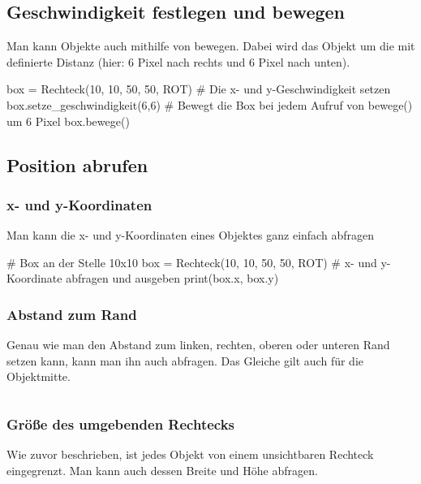\documentclass{\VorlagenPfad/coderdojokatext}
\begin{document}
\inputminted[firstline=29,lastline=38]{python}{../../../Beispiele/py2cd/objekte_positionieren.py}

\subsection{Geschwindigkeit festlegen und bewegen}
Man kann Objekte auch mithilfe von  bewegen. Dabei wird das Objekt um die mit  definierte Distanz (hier: 6 Pixel nach rechts und 6 Pixel nach unten).

\begin{pythoncode}
box = Rechteck(10, 10, 50, 50, ROT)
# Die x- und y-Geschwindigkeit setzen
box.setze_geschwindigkeit(6,6)
# Bewegt die Box bei jedem Aufruf von bewege() um 6 Pixel
box.bewege()
\end{pythoncode}



\subsection{Position abrufen}
\subsubsection{x- und y-Koordinaten}
Man kann die x- und y-Koordinaten eines Objektes ganz einfach abfragen
\begin{pythoncode}
# Box an der Stelle 10x10
box = Rechteck(10, 10, 50, 50, ROT)
# x- und y-Koordinate abfragen und ausgeben
print(box.x, box.y)
\end{pythoncode}

\subsubsection{Abstand zum Rand}
Genau wie man den Abstand zum linken, rechten, oberen  oder unteren Rand setzen kann, kann man ihn auch abfragen. Das Gleiche gilt auch für die Objektmitte.

\inputminted[firstline=42,lastline=60]{python}{../../../Beispiele/py2cd/objekte_positionieren.py}

\subsubsection{Größe des umgebenden Rechtecks}
Wie zuvor beschrieben, ist jedes Objekt von einem unsichtbaren Rechteck eingegrenzt. Man kann auch dessen Breite und Höhe abfragen.
\end{document}
